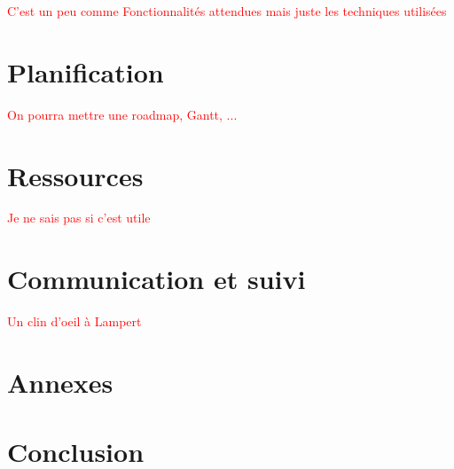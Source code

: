 \documentclass{article}
\begin{document}
\textcolor{red}{C'est un peu comme Fonctionnalités attendues mais juste les techniques utilisées}

\section{Planification}

\textcolor{red}{On pourra mettre une roadmap, Gantt, ...}

\section{Ressources}

\textcolor{red}{Je ne sais pas si c'est utile}

\section{Communication et suivi}
\textcolor{red}{Un clin d'oeil à Lampert} 

\section{Annexes}

\section{Conclusion}
\end{document}
